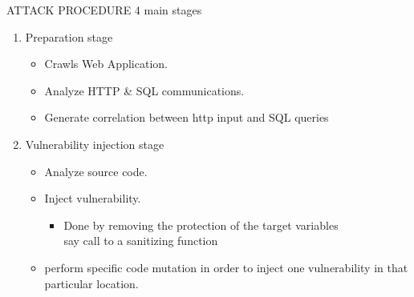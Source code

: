 \documentclass[xcolor=x11names,compress]{beamer}
\renewcommand{\(}{\begin{columns}}
\renewcommand{\)}{\end{columns}}
\newcommand{\<}[1]{\begin{column}{#1}}
\renewcommand{\>}{\end{column}}
\begin{document}
\begin{frame}{ATTACK PROCEDURE}
	4 main stages \newline
\begin{enumerate}
	\item Preparation stage
	\begin{itemize}
		\item Crawls Web Application.
		\item Analyze HTTP \& SQL communications.
		\item Generate correlation between http input and SQL queries
	\end{itemize}
	\item  Vulnerability injection stage
	\begin{itemize}
		\item Analyze source code.
		\item Inject vulnerability.
		\begin{itemize}
			\item Done by removing
			the protection of the target variables \\say call to a sanitizing function
		\end{itemize}
		\item perform specific code mutation in order to inject one vulnerability in that particular location.
	\end{itemize}
	
\end{enumerate}
\end{frame}
\end{document}
